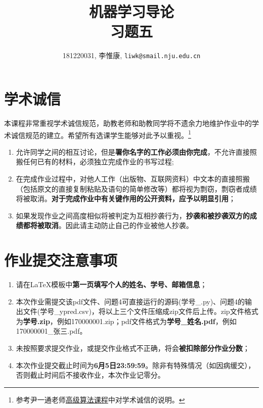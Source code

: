 \documentclass[a4paper,UTF8]{article}
\theoremstyle{definition}
\begin{document}
\title{机器学习导论\\习题五}
\author{181220031, 李惟康, \texttt{liwk@smail.nju.edu.cn}}
\maketitle


\section*{学术诚信}

本课程非常重视学术诚信规范，助教老师和助教同学将不遗余力地维护作业中的学术诚信规范的建立。希望所有选课学生能够对此予以重视。\footnote{参考尹一通老师\href{http://tcs.nju.edu.cn/wiki/}{高级算法课程}中对学术诚信的说明。}

\begin{tcolorbox}
	\begin{enumerate}
		\item[(1)] 允许同学之间的相互讨论，但是{\color{red}\textbf{署你名字的工作必须由你完成}}，不允许直接照搬任何已有的材料，必须独立完成作业的书写过程;
		\item[(2)] 在完成作业过程中，对他人工作（出版物、互联网资料）中文本的直接照搬（包括原文的直接复制粘贴及语句的简单修改等）都将视为剽窃，剽窃者成绩将被取消。{\color{red}\textbf{对于完成作业中有关键作用的公开资料，应予以明显引用}}；
		\item[(3)] 如果发现作业之间高度相似将被判定为互相抄袭行为，{\color{red}\textbf{抄袭和被抄袭双方的成绩都将被取消}}。因此请主动防止自己的作业被他人抄袭。
	\end{enumerate}
\end{tcolorbox}

\section*{作业提交注意事项}
\begin{tcolorbox}
	\begin{enumerate}
		\item[(1)] 请在LaTeX模板中{\color{red}\textbf{第一页填写个人的姓名、学号、邮箱信息}}；
		\item[(2)] 本次作业需提交该pdf文件、问题4可直接运行的源码(学号\_.py)、问题4的输出文件(学号\_ypred.csv)，将以上三个文件压缩成zip文件后上传。zip文件格式为{\color{red}\textbf{学号.zip}}，例如170000001.zip；pdf文件格式为{\color{red}\textbf{学号\_姓名.pdf}}，例如170000001\_张三.pdf。
		\item[(3)] 未按照要求提交作业，或提交作业格式不正确，将会{\color{red}\textbf{被扣除部分作业分数}}；
		\item[(4)] 本次作业提交截止时间为{\color{red}\textbf{6月5日23:59:59}}。除非有特殊情况（如因病缓交），否则截止时间后不接收作业，本次作业记零分。
	\end{enumerate}
\end{tcolorbox}
\end{document}

